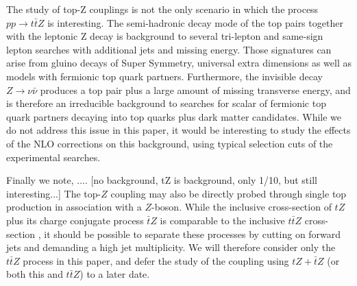 \documentclass[preprint]{JHEP3} %
\def\ttbZ{t\bar{t}Z}
\begin{document}

The study of top-Z couplings is not the only scenario in which the process $pp\to\ttbZ$ is interesting. 
The semi-hadronic decay mode of the top pairs together with the leptonic Z decay is background to several tri-lepton and same-sign lepton searches with additional jets and missing energy.
Those signatures can arise from gluino decays of Super Symmetry, universal extra dimensions as well as models with fermionic top quark partners. 
Furthermore, the invisible decay $Z \to \nu \bar{\nu}$ produces a top pair plus a large amount of missing transverse energy, and is therefore an irreducible background to searches for 
scalar of fermionic top quark partners decaying into top quarks plus dark matter candidates.
While we do not address this issue in this paper, it would be interesting to study the effects of the NLO corrections on this background, using typical selection  cuts of the experimental searches.

Finally we note, .... [no background, tZ is background, only 1/10, but still interesting...]
The top-$Z$ coupling may also be directly probed through single top production in association with a $Z$-boson. While the inclusive cross-section of $tZ$ plus its charge conjugate process $\bar{t}Z$ is comparable to the inclusive $\ttbZ$ cross-section \cite{Campbell:2013yla}, it should be possible to separate these processes by cutting on forward jets and demanding a high jet multiplicity. We will therefore consider only the $\ttbZ$ process in this paper, and defer the study of the coupling using $tZ+\bar{t}Z$ (or both this and $\ttbZ$) to a later date.

\end{document}
